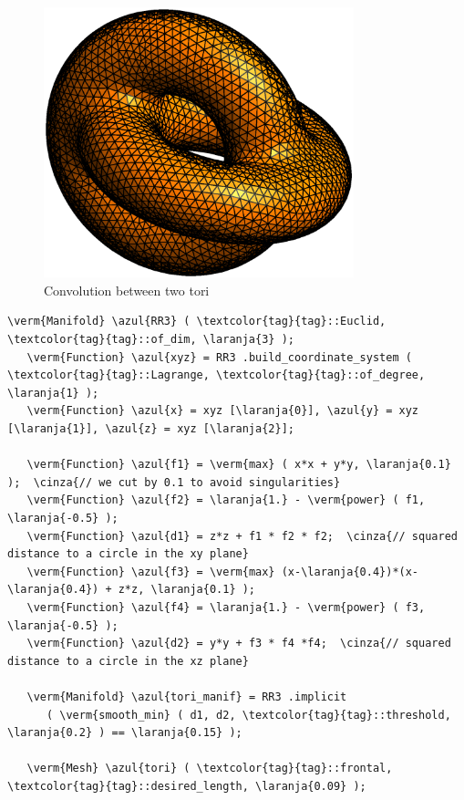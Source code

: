 \begin{figure}[ht] \centering
 \includegraphics[width=90mm]{two-tori}
  \caption{Convolution between two tori}
\end{figure}

\begin{Verbatim}[commandchars=\\\{\},formatcom=\small\tt,frame=single,
   label=parag-\ref{\numb section 3.\numb parag 7}.cpp,rulecolor=\color{moldura},
   baselinestretch=0.94,framesep=2mm                                            ]
   \verm{Manifold} \azul{RR3} ( \textcolor{tag}{tag}::Euclid, \textcolor{tag}{tag}::of_dim, \laranja{3} );
   \verm{Function} \azul{xyz} = RR3 .build_coordinate_system ( \textcolor{tag}{tag}::Lagrange, \textcolor{tag}{tag}::of_degree, \laranja{1} );
   \verm{Function} \azul{x} = xyz [\laranja{0}], \azul{y} = xyz [\laranja{1}], \azul{z} = xyz [\laranja{2}];

   \verm{Function} \azul{f1} = \verm{max} ( x*x + y*y, \laranja{0.1} );  \cinza{// we cut by 0.1 to avoid singularities}
   \verm{Function} \azul{f2} = \laranja{1.} - \verm{power} ( f1, \laranja{-0.5} );
   \verm{Function} \azul{d1} = z*z + f1 * f2 * f2;  \cinza{// squared distance to a circle in the xy plane}
   \verm{Function} \azul{f3} = \verm{max} (x-\laranja{0.4})*(x-\laranja{0.4}) + z*z, \laranja{0.1} );
   \verm{Function} \azul{f4} = \laranja{1.} - \verm{power} ( f3, \laranja{-0.5} );
   \verm{Function} \azul{d2} = y*y + f3 * f4 *f4;  \cinza{// squared distance to a circle in the xz plane}

   \verm{Manifold} \azul{tori_manif} = RR3 .implicit
      ( \verm{smooth_min} ( d1, d2, \textcolor{tag}{tag}::threshold, \laranja{0.2} ) == \laranja{0.15} );

   \verm{Mesh} \azul{tori} ( \textcolor{tag}{tag}::frontal, \textcolor{tag}{tag}::desired_length, \laranja{0.09} );
\end{Verbatim}

